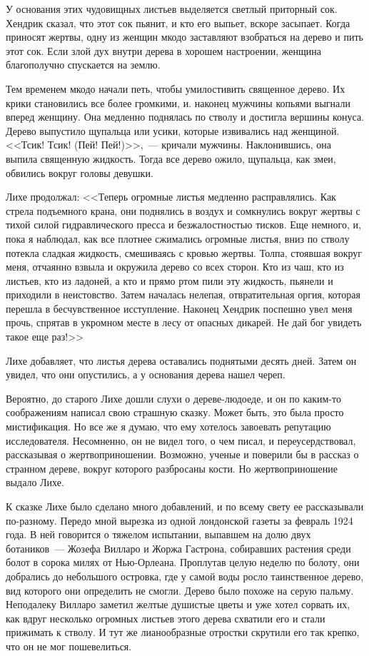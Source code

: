 \documentclass[12pt,a4paper,twoside,openany,svgnames]{memoir}
\begin{document}
У основания этих чудовищных листьев выделяется светлый приторный сок. Хендрик сказал, что этот сок пьянит, и кто его выпьет, вскоре засыпает. Когда приносят жертвы, одну из женщин мкодо заставляют взобраться на дерево и пить этот сок. Если злой дух внутри дерева в хорошем настроении, женщина благополучно спускается на землю.

Тем временем мкодо начали петь, чтобы умилостивить священное дерево. Их крики становились все более громкими, и. наконец мужчины копьями выгнали вперед женщину. Она медленно поднялась по стволу и достигла вершины конуса. Дерево выпустило щупальца или усики, которые извивались над женщиной. <<Тсик! Тсик! (Пей! Пей!)>>,~--- кричали мужчины. Наклонившись, она выпила священную жидкость. Тогда все дерево ожило, щупальца, как змеи, обвились вокруг головы девушки.

Лихе продолжал: <<Теперь огромные листья медленно расправлялись. Как стрела подъемного крана, они поднялись в воздух и сомкнулись вокруг жертвы с тихой силой гидравлического пресса и безжалостностью тисков. Еще немного, и, пока я наблюдал, как все плотнее сжимались огромные листья, вниз по стволу потекла сладкая жидкость, смешиваясь с кровью жертвы. Толпа, стоявшая вокруг меня, отчаянно взвыла и окружила дерево со всех сторон. Кто из чаш, кто из листьев, кто из ладоней, а кто и прямо ртом пили эту жидкость, пьянели и приходили в неистовство. Затем началась нелепая, отвратительная оргия, которая перешла в бесчувственное исступление. Наконец Хендрик поспешно увел меня прочь, спрятав в укромном месте в лесу от опасных дикарей. Не дай бог увидеть такое еще раз!>>

Лихе добавляет, что листья дерева оставались поднятыми десять дней. Затем он увидел, что они опустились, а у основания дерева нашел череп.

Вероятно, до старого Лихе дошли слухи о дереве-людоеде, и он по каким-то соображениям написал свою страшную сказку. Может быть, это была просто мистификация. Но все же я думаю, что ему хотелось завоевать репутацию исследователя. Несомненно, он не видел того, о чем писал, и переусердствовал, рассказывая о жертвоприношении. Возможно, ученые и поверили бы в рассказ о странном дереве, вокруг которого разбросаны кости. Но жертвоприношение выдало Лихе.

К сказке Лихе было сделано много добавлений, и по всему свету ее рассказывали по-разному. Передо мной вырезка из одной лондонской газеты за февраль 1924 года. В ней говорится о тяжелом испытании, выпавшем на долю двух ботаников~--- Жозефа Вилларо и Жоржа Гастрона, собиравших растения среди болот в сорока милях от Нью-Орлеана. Проплутав целую неделю по болоту, они добрались до небольшого островка, где у самой воды росло таинственное дерево, вид которого они определить не смогли. Дерево было похоже на серую пальму. Неподалеку Вилларо заметил желтые душистые цветы и уже хотел сорвать их, как вдруг несколько огромных листьев этого дерева схватили его и стали прижимать к стволу. И тут же лианообразные отростки скрутили его так крепко, что он не мог пошевелиться.
\end{document}
